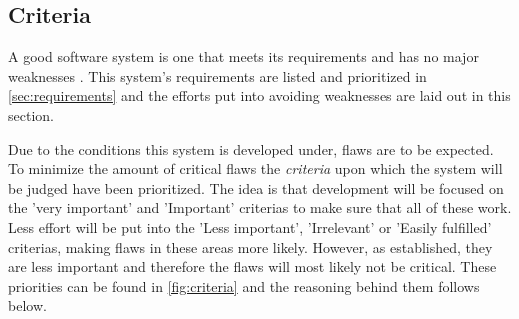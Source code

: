 \subsection{Criteria}\label{sec:architecturecriteria}
A good software system is one that meets its requirements and has no major weaknesses \citep[p.~179]{Rod-Aalborg}.
This system's requirements are listed and prioritized in \cref{sec:requirements} and the efforts put into avoiding weaknesses are laid out in this section.

Due to the conditions this system is developed under, flaws are to be expected.
To minimize the amount of critical flaws the \textit{criteria} \citep[p.~180]{Rod-Aalborg} upon which the system will be judged have been prioritized.
The idea is that development will be focused on the 'very important' and 'Important' criterias to make sure that all of these work.
Less effort will be put into the 'Less important', 'Irrelevant' or 'Easily fulfilled' criterias, making flaws in these areas more likely.
However, as established, they are less important and therefore the flaws will most likely not be critical.
These priorities can be found in \cref{fig:criteria} and the reasoning behind them follows below.



